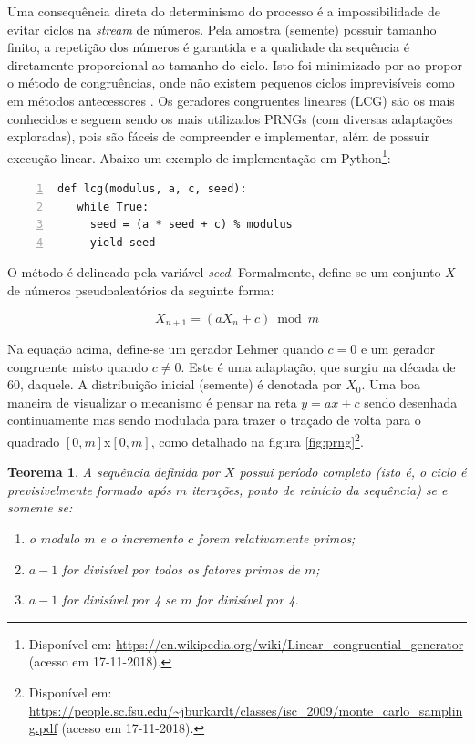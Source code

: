 \documentclass[a4paper,12pt]{monografia}
\theoremstyle{plain}
\newtheorem{theorem}{Teorema}[section]
\theoremstyle{definition}
\theoremstyle{remark}
\begin{document}
Uma consequ\^{e}ncia direta do determinismo do processo \'{e} a impossibilidade de evitar ciclos na \textit{stream} de n\'{u}meros.
Pela amostra (semente) possuir tamanho finito, a repeti\c{c}\~{a}o dos n\'{u}meros \'{e} garantida e a qualidade da sequ\^{e}ncia \'{e} diretamente proporcional ao tamanho do ciclo.
Isto foi minimizado por  ao propor o m\'{e}todo de congru\^{e}ncias, onde n\~{a}o existem pequenos ciclos imprevis\'{i}veis como em m\'{e}todos antecessores \cite{johnson}.
Os geradores congruentes lineares (LCG) s\~{a}o os mais conhecidos e seguem sendo os mais utilizados PRNGs (com diversas adapta\c{c}\~{o}es exploradas), pois s\~{a}o f\'{a}ceis de compreender e implementar, al\'{e}m de possuir execu\c{c}\~{a}o linear.
Abaixo um exemplo de implementa\c{c}\~{a}o em Python\footnote{Dispon\'{i}vel em: \url{https://en.wikipedia.org/wiki/Linear_congruential_generator} (acesso em 17-11-2018).}:

\lstset{tabsize=5,language=Python,showstringspaces=false,basicstyle=\ttfamily\small,keywordstyle=\bf,breaklines=true}
\begin{singlespacing}
\begin{lstlisting}[frame=single,framexrightmargin=1pt,numbers=left]
 def lcg(modulus, a, c, seed):
   while True:
     seed = (a * seed + c) % modulus
     yield seed
\end{lstlisting}
\end{singlespacing}

O m\'{e}todo \'{e} delineado pela vari\'{a}vel \textit{seed}. Formalmente, define-se um conjunto $X$ de n\'{u}meros pseudoaleat\'{o}rios da seguinte forma:

\begin{equation}
X_{n+1}=(aX_{n}+c) \bmod m
\label{eq:lcg}
\end{equation}

Na equa\c{c}\~{a}o acima, define-se um gerador Lehmer quando $c=0$ e um gerador congruente misto quando $c\neq0$.
Este \'{e} uma adapta\c{c}\~{a}o, que surgiu na d\'{e}cada de 60, daquele.
A distribui\c{c}\~{a}o inicial (semente) \'{e} denotada por $X_0$.
Uma boa maneira de visualizar o mecanismo \'{e} pensar na reta $y=ax+c$ sendo desenhada continuamente mas sendo modulada para trazer o tra\c{c}ado de volta para o quadrado $[0,m]$x$[0,m]$, como detalhado na figura \ref{fig:prng}\footnote{Dispon\'{i}vel em: \url{https://people.sc.fsu.edu/~jburkardt/classes/isc_2009/monte_carlo_sampling.pdf} (acesso em 17-11-2018).}.

\begin{theorem}
A sequ\^{e}ncia definida por $X$ possui per\'{i}odo completo (isto \'{e}, o ciclo \'{e} previsivelmente formado ap\'{o}s $m$ itera\c{c}\~{o}es, ponto de rein\'{i}cio da sequ\^{e}ncia)  se e somente se:
\begin{enumerate}
  \item o modulo $m$ e o incremento $c$ forem relativamente primos;
  \item $a-1$ for divis\'{i}vel por todos os fatores primos de $m$;
  \item $a-1$ for divis\'{i}vel por 4 se $m$ for divis\'{i}vel por 4.
\end{enumerate}
\end{theorem}
\end{document}
